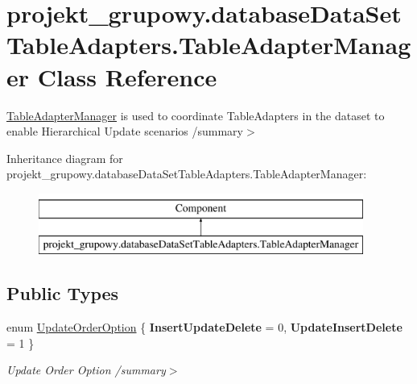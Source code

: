 \hypertarget{classprojekt__grupowy_1_1database_data_set_table_adapters_1_1_table_adapter_manager}{}\section{projekt\+\_\+grupowy.\+database\+Data\+Set\+Table\+Adapters.\+Table\+Adapter\+Manager Class Reference}
\label{classprojekt__grupowy_1_1database_data_set_table_adapters_1_1_table_adapter_manager}


\hyperlink{classprojekt__grupowy_1_1database_data_set_table_adapters_1_1_table_adapter_manager}{Table\+Adapter\+Manager} is used to coordinate Table\+Adapters in the dataset to enable Hierarchical Update scenarios /summary$>$  


Inheritance diagram for projekt\+\_\+grupowy.\+database\+Data\+Set\+Table\+Adapters.\+Table\+Adapter\+Manager\+:\begin{figure}[H]
\begin{center}
\leavevmode
\includegraphics[height=2.000000cm]{classprojekt__grupowy_1_1database_data_set_table_adapters_1_1_table_adapter_manager}
\end{center}
\end{figure}
\subsection*{Public Types}
\begin{DoxyCompactItemize}
\item 
\mbox{\label{classprojekt__grupowy_1_1database_data_set_table_adapters_1_1_table_adapter_manager_a28f63071f27298d15ff7cdcac275d946}} 
enum \hyperlink{classprojekt__grupowy_1_1database_data_set_table_adapters_1_1_table_adapter_manager_a28f63071f27298d15ff7cdcac275d946}{Update\+Order\+Option} \{ {\bfseries Insert\+Update\+Delete} = 0, 
{\bfseries Update\+Insert\+Delete} = 1
 \}\begin{DoxyCompactList}\small\item\em Update Order Option /summary$>$ \end{DoxyCompactList}
\end{DoxyCompactItemize}
